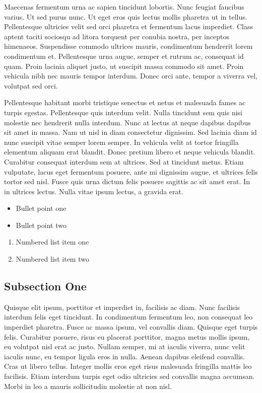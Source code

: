 \documentclass[final,11pt,3p]{elsarticle}
\begin{document}
Maecenas \cite{Smith:2012qr} fermentum \cite{Smith:2013jd} urna ac sapien tincidunt lobortis. Nunc feugiat faucibus varius. Ut sed purus nunc. Ut eget eros quis lectus mollis pharetra ut in tellus. Pellentesque ultricies velit sed orci pharetra et fermentum lacus imperdiet. Class aptent taciti sociosqu ad litora torquent per conubia nostra, per inceptos himenaeos. Suspendisse commodo ultrices mauris, condimentum hendrerit lorem condimentum et. Pellentesque urna augue, semper et rutrum ac, consequat id quam. Proin lacinia aliquet justo, ut suscipit massa commodo sit amet. Proin vehicula nibh nec mauris tempor interdum. Donec orci ante, tempor a viverra vel, volutpat sed orci.

Pellentesque habitant morbi tristique senectus et netus et malesuada fames ac turpis egestas. Pellentesque quis interdum velit. Nulla tincidunt sem quis nisi molestie nec hendrerit nulla interdum. Nunc at lectus at neque dapibus dapibus sit amet in massa. Nam ut nisl in diam consectetur dignissim. Sed lacinia diam id nunc suscipit vitae semper lorem semper. In vehicula velit at tortor fringilla elementum aliquam erat blandit. Donec pretium libero et neque vehicula blandit. Curabitur consequat interdum sem at ultrices. Sed at tincidunt metus. Etiam vulputate, lacus eget fermentum posuere, ante mi dignissim augue, et ultrices felis tortor sed nisl. Fusce quis urna dictum felis posuere sagittis ac sit amet erat. In in ultrices lectus. Nulla vitae ipsum lectus, a gravida erat. 
 
\begin{itemize}
\item Bullet point one
\item Bullet point two
\end{itemize}

\begin{enumerate}
\item Numbered list item one
\item Numbered list item two
\end{enumerate}

\subsection{Subsection One}

Quisque elit ipsum, porttitor et imperdiet in, facilisis ac diam. Nunc facilisis interdum felis eget tincidunt. In condimentum fermentum leo, non consequat leo imperdiet pharetra. Fusce ac massa ipsum, vel convallis diam. Quisque eget turpis felis. Curabitur posuere, risus eu placerat porttitor, magna metus mollis ipsum, eu volutpat nisl erat ac justo. Nullam semper, mi at iaculis viverra, nunc velit iaculis nunc, eu tempor ligula eros in nulla. Aenean dapibus eleifend convallis. Cras ut libero tellus. Integer mollis eros eget risus malesuada fringilla mattis leo facilisis. Etiam interdum turpis eget odio ultricies sed convallis magna accumsan. Morbi in leo a mauris sollicitudin molestie at non nisl.
\end{document}
